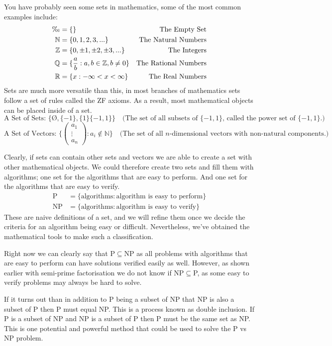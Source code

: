 \documentclass[twoside,10pt]{article}
\begin{document}
You have probably seen some sets in mathematics, some of the most common examples include:
\begin{align*}
    \O &= \{\}&\text{The Empty Set}\\
    \mathbb{N} &= \{0,1,2,3,...\}&\text{The Natural Numbers}\\
    \mathbb{Z} &= \{0,\pm 1,\pm 2,\pm 3,...\}&\text{The Integers}\\
    \mathbb{Q} &= \{\dfrac{a}{b}:a,b\in\mathbb{Z},b\neq0\}&\text{The Rational Numbers}\\
    \mathbb{R} &= \{x:-\infty<x<\infty\}&\text{The Real Numbers}
\end{align*}
Sets are much more versatile than this, in most branches of mathematics sets follow a set of rules called the ZF axioms. As a result, most mathematical objects can be placed inside of a set.
\[\text{A Set of Sets: }\{\text{\O},\{-1\},\{1\}\{-1,1\}\}\quad\text{(The set of all subsets of $\{-1,1\}$, called the power set of $\{-1,1\}$.)}\]
\[\text{A Set of Vectors: }\{\begin{pmatrix}a_{1}\\\vdots\\a_{n}\end{pmatrix}:a_{i}\not\in\mathbb{N}\}\quad\text{(The set of all $n$-dimensional vectors with non-natural components.)}\]

Clearly, if sets can contain other sets and vectors we are able to create a set with other mathematical objects. We could therefore create two sets and fill them with algorithms; one set for the algorithms that are easy to perform. And one set for the algorithms that are easy to verify.
\begin{align}
    \text{P} &= \{\text{algorithms}:\text{algorithm is easy to perform}\}\\
    \text{NP} &= \{\text{algorithms}:\text{algorithm is easy to verify}\}
\end{align}
These are naive definitions of a set, and we will refine them once we decide the criteria for an algorithm being easy or difficult. Nevertheless, we've obtained the mathematical tools to make such a classification.

Right now we can clearly say that P$\subseteq$NP as all problems with algorithms that are easy to perform can have solutions verified easily as well. However, as shown earlier with semi-prime factorisation we do not know if NP$\subseteq$P, as some easy to verify problems may always be hard to solve. 

If it turns out than in addition to P being a subset of NP that NP is also a subset of P then P must equal NP. This is a process known as double inclusion. If P is a subset of NP and NP is a subset of P then P must be the same set as NP. This is one potential and powerful method that could be used to solve the P vs NP problem.
\end{document}
